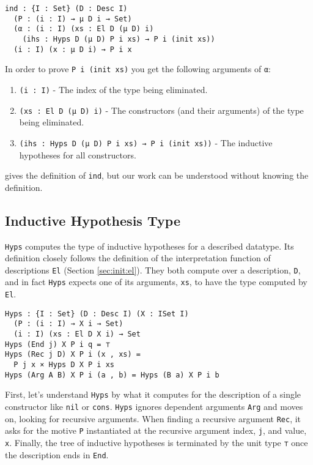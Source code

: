 \documentclass[nonatbib]{sigplanconf}
\newcommand{\refsec}[1]{Section \ref{sec:#1}}
\begin{document}
\begin{verbatim}
ind : {I : Set} (D : Desc I)
  (P : (i : I) → μ D i → Set)
  (α : (i : I) (xs : El D (μ D) i)
    (ihs : Hyps D (μ D) P i xs) → P i (init xs))
  (i : I) (x : μ D i) → P i x
\end{verbatim}

In order to prove {\tt P i (init xs)} you get the following
arguments of \verb+α+:

\begin{enumerate}
\item{{\tt (i : I)}} - The index of the type being eliminated.
\item{{\tt (xs : El D (μ D) i)}} - The constructors (and their arguments) of the type
  being eliminated.
\item{{\tt (ihs : Hyps D (μ D) P i xs) → P i (init xs))}} - The inductive
  hypotheses for all constructors.
\end{enumerate}

\citet{mcbride2010ornamental} gives the definition of {\tt ind}, but
our work can be understood without knowing the definition.

\subsection{Inductive Hypothesis Type}

{\tt Hyps} computes the type of inductive hypotheses for a described
datatype. Its definition closely follows the definition of
the interpretation function of descriptions {\tt El}
(\refsec{init:el}). They both compute over a description, {\tt D}, and in
fact {\tt Hyps} expects one of its arguments, {\tt xs}, to have the type
computed by {\tt El}.

\begin{verbatim}
Hyps : {I : Set} (D : Desc I) (X : ISet I)
  (P : (i : I) → X i → Set)
  (i : I) (xs : El D X i) → Set
Hyps (End j) X P i q = ⊤
Hyps (Rec j D) X P i (x , xs) =
  P j x × Hyps D X P i xs
Hyps (Arg A B) X P i (a , b) = Hyps (B a) X P i b
\end{verbatim}

First, let's understand {\tt Hyps} by what it computes for the
description of a single constructor like {\tt nil} or {\tt cons}.
{\tt Hyps} ignores dependent arguments {\tt Arg} and moves on, looking
for recursive arguments. When finding a recursive argument {\tt Rec}, it
asks for the motive {\tt P} instantiated at the recursive argument index, {\tt j}, and value, {\tt x}.
Finally, the tree of inductive hypotheses is terminated by the unit
type {\tt ⊤} once the description ends in {\tt End}.
\end{document}
